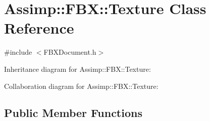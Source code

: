 \hypertarget{class_assimp_1_1_f_b_x_1_1_texture}{\section{Assimp\+:\+:F\+B\+X\+:\+:Texture Class Reference}
\label{class_assimp_1_1_f_b_x_1_1_texture}
}


{\ttfamily \#include $<$F\+B\+X\+Document.\+h$>$}



Inheritance diagram for Assimp\+:\+:F\+B\+X\+:\+:Texture\+:


Collaboration diagram for Assimp\+:\+:F\+B\+X\+:\+:Texture\+:
\subsection*{Public Member Functions}
